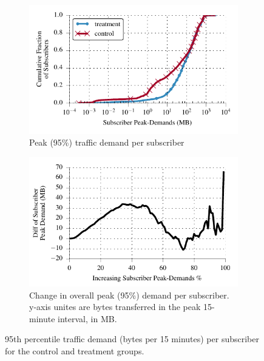 \begin{figure}[t]
\begin{minipage}{1\linewidth}
\centering
%
%
\begin{subfigure}[b]{1\linewidth}
\includegraphics[width=\linewidth]{figures/cdf_peak_demand-overall.pdf}
               \caption{Peak (95\%) traffic demand per subscriber\label{fig:CDF-data-rate-perc95}}
\end{subfigure}

\begin{subfigure}[b]{1\linewidth}
\includegraphics[width=\linewidth]{figures/diff_perc95_bytes_subsc-overall_01.pdf}		%
               \caption{
                 Change in overall peak (95\%) demand per subscriber. y-axis unites
                  are bytes transferred in the peak 15-minute
                  interval, in MB.
 \label{fig:diff-peak-overall}}
\end{subfigure}
%
\end{minipage}
\caption{95th percentile traffic demand (bytes per 15 minutes) per
  subscriber for the control and treatment groups. \label{fig:traffic-demand-overall}}
\end{figure}

